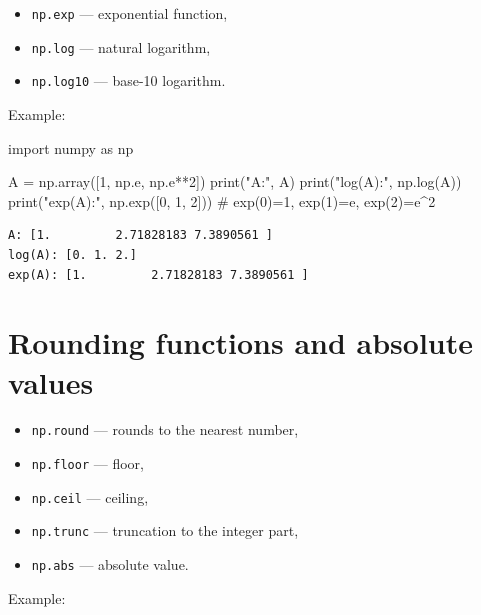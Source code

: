 \documentclass[
  english,
  letterpaper,
  DIV=11,
  numbers=noendperiod]{scrreprt}
\newenvironment{Shaded}{\begin{snugshade}}{\end{snugshade}}
\newcommand{\BuiltInTok}[1]{\textcolor[rgb]{0.00,0.23,0.31}{#1}}
\newcommand{\CommentTok}[1]{\textcolor[rgb]{0.37,0.37,0.37}{#1}}
\newcommand{\DecValTok}[1]{\textcolor[rgb]{0.68,0.00,0.00}{#1}}
\newcommand{\ImportTok}[1]{\textcolor[rgb]{0.00,0.46,0.62}{#1}}
\newcommand{\NormalTok}[1]{\textcolor[rgb]{0.00,0.23,0.31}{#1}}
\newcommand{\OperatorTok}[1]{\textcolor[rgb]{0.37,0.37,0.37}{#1}}
\newcommand{\StringTok}[1]{\textcolor[rgb]{0.13,0.47,0.30}{#1}}
\providecommand{\tightlist}{%
  \setlength{\itemsep}{0pt}\setlength{\parskip}{0pt}}
\begin{document}
\begin{itemize}
\tightlist
\item
  \texttt{np.exp} --- exponential function,
\item
  \texttt{np.log} --- natural logarithm,
\item
  \texttt{np.log10} --- base-10 logarithm.
\end{itemize}

Example:

\begin{Shaded}
\begin{Highlighting}[]
\ImportTok{import}\NormalTok{ numpy }\ImportTok{as}\NormalTok{ np}

\NormalTok{A }\OperatorTok{=}\NormalTok{ np.array([}\DecValTok{1}\NormalTok{, np.e, np.e}\OperatorTok{**}\DecValTok{2}\NormalTok{])}
\BuiltInTok{print}\NormalTok{(}\StringTok{"A:"}\NormalTok{, A)}
\BuiltInTok{print}\NormalTok{(}\StringTok{"log(A):"}\NormalTok{, np.log(A))}
\BuiltInTok{print}\NormalTok{(}\StringTok{"exp(A):"}\NormalTok{, np.exp([}\DecValTok{0}\NormalTok{, }\DecValTok{1}\NormalTok{, }\DecValTok{2}\NormalTok{]))  }\CommentTok{\# exp(0)=1, exp(1)=e, exp(2)=e\^{}2}
\end{Highlighting}
\end{Shaded}

\begin{verbatim}
A: [1.         2.71828183 7.3890561 ]
log(A): [0. 1. 2.]
exp(A): [1.         2.71828183 7.3890561 ]
\end{verbatim}

\section{Rounding functions and absolute
values}\label{rounding-functions-and-absolute-values}

\begin{itemize}
\tightlist
\item
  \texttt{np.round} --- rounds to the nearest number,
\item
  \texttt{np.floor} --- floor,
\item
  \texttt{np.ceil} --- ceiling,
\item
  \texttt{np.trunc} --- truncation to the integer part,
\item
  \texttt{np.abs} --- absolute value.
\end{itemize}

Example:
\end{document}
